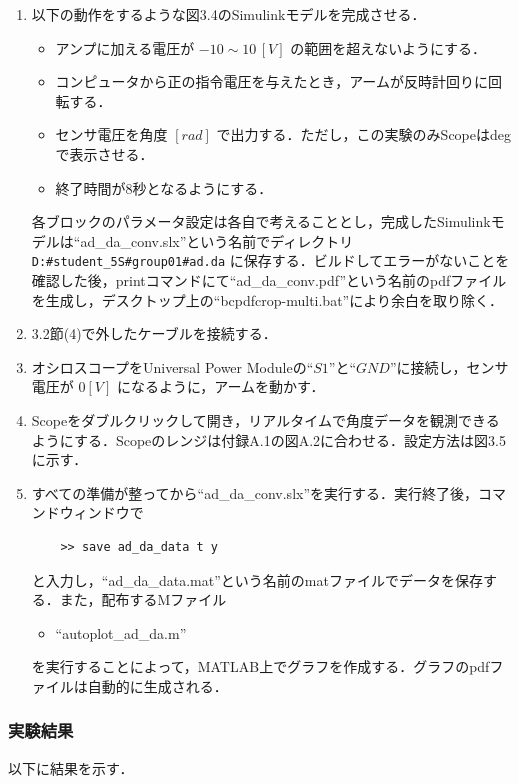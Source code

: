 \begin{enumerate}
  \item 以下の動作をするような図3.4のSimulinkモデルを完成させる．
        \begin{itemize}
          \item アンプに加える電圧が $-10 \sim 10 \, [V]$ の範囲を超えないようにする．
          \item コンピュータから正の指令電圧を与えたとき，アームが反時計回りに回転する．
          \item センサ電圧を角度 $[rad]$ で出力する．ただし，この実験のみScopeはdegで表示させる．
          \item 終了時間が8秒となるようにする．
        \end{itemize}
        
        各ブロックのパラメータ設定は各自で考えることとし，完成したSimulinkモデルは“ad\_da\_conv.slx”という名前でディレクトリ \texttt{D:\#student\_5S\#group01\#ad.da} に保存する．ビルドしてエラーがないことを確認した後，printコマンドにて“ad\_da\_conv.pdf”という名前のpdfファイルを生成し，デスクトップ上の“bcpdfcrop-multi.bat”により余白を取り除く．
        
  \item 3.2節(4)で外したケーブルを接続する．
  \item オシロスコープをUniversal Power Moduleの“$S1$”と“$GND$”に接続し，センサ電圧が $0 [V]$ になるように，アームを動かす．
  \item Scopeをダブルクリックして開き，リアルタイムで角度データを観測できるようにする．Scopeのレンジは付録A.1の図A.2に合わせる．設定方法は図3.5に示す．
  \item すべての準備が整ってから“ad\_da\_conv.slx”を実行する．実行終了後，コマンドウィンドウで
        \begin{verbatim}
    >> save ad_da_data t y 
    \end{verbatim}
        と入力し，“ad\_da\_data.mat”という名前のmatファイルでデータを保存する．また，配布するMファイル
        \begin{itemize}
          \item “autoplot\_ad\_da.m”
        \end{itemize}
        を実行することによって，MATLAB上でグラフを作成する．グラフのpdfファイルは自動的に生成される．
\end{enumerate}

\subsubsection{実験結果}
以下に結果を示す．

